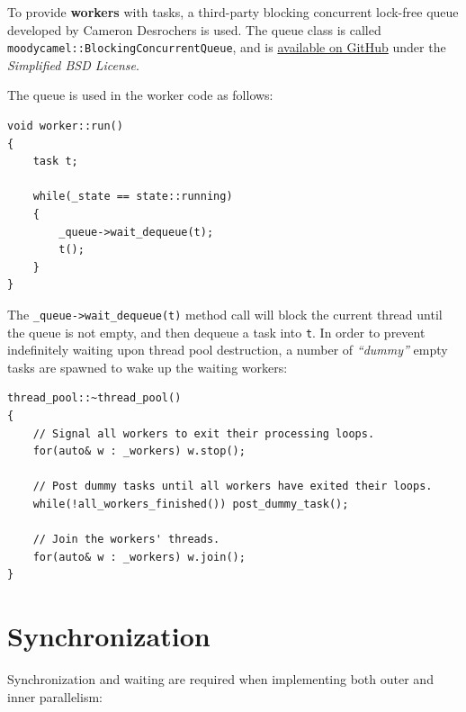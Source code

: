 \documentclass[twoside, 12pt, a4paper, openany]{book}
\begin{document}
To provide \textbf{workers} with tasks, a third-party blocking
concurrent lock-free queue developed by Cameron Desrochers is used. The
queue class is called
\texttt{moodycamel::BlockingConcurrentQueue},
and is \href{https://github.com/cameron314/concurrentqueue}{available on
GitHub} under the \emph{Simplified BSD License}.

The queue is used in the worker code as follows:

\begin{verbatim}
void worker::run()
{
    task t;

    while(_state == state::running)
    {
        _queue->wait_dequeue(t);
        t();
    }
}
\end{verbatim}

The
\texttt{_queue->wait_dequeue(t)}
method call will block the current thread until the queue is not empty,
and then dequeue a task into
\texttt{t}.
In order to prevent indefinitely waiting upon thread pool destruction, a
number of \emph{``dummy''} empty tasks are spawned to wake up the
waiting workers:

\begin{verbatim}
thread_pool::~thread_pool()
{
    // Signal all workers to exit their processing loops.
    for(auto& w : _workers) w.stop();

    // Post dummy tasks until all workers have exited their loops.
    while(!all_workers_finished()) post_dummy_task();

    // Join the workers' threads.
    for(auto& w : _workers) w.join();
}
\end{verbatim}

\section{Synchronization}\label{synchronization}

Synchronization and waiting are required when implementing both outer
and inner parallelism:
\end{document}
